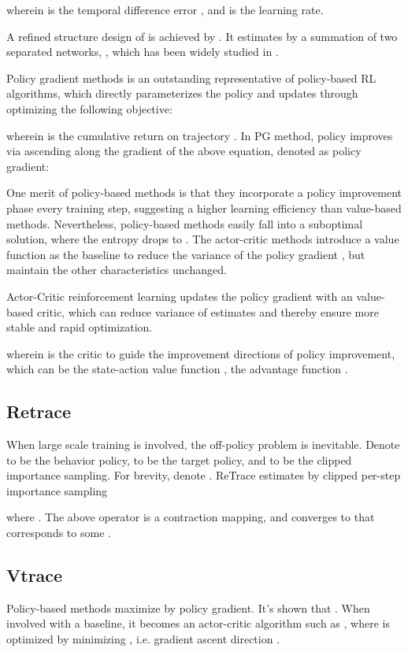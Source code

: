 \documentclass[nohyperref]{article}
\theoremstyle{plain}
\begin{document}
wherein  is the temporal difference error \citep{TDerror}, and  is the learning rate.

A refined structure design of  is achieved by \citep{dueling_q}. It estimates  by a summation of two separated networks, , which has been widely studied in \citep{dueling_q,casa_bridge}.


Policy gradient \citep[PG]{williams1992simple} methods is an outstanding representative of policy-based RL algorithms, which directly parameterizes the policy and  updates through optimizing the following objective: 

wherein  is the cumulative return on trajectory . In PG method, policy improves via ascending  along the gradient of the above equation, denoted as policy gradient:


One merit of policy-based methods is that they incorporate a policy improvement phase every training step, suggesting a higher learning efficiency than value-based methods.
Nevertheless, policy-based methods easily fall into a suboptimal solution, where the entropy drops to  \citep{sac}.
The actor-critic methods introduce a value function as the baseline to reduce the variance of the policy gradient \citep{a3c}, but maintain the other characteristics unchanged.

Actor-Critic \citep[AC]{sutton} reinforcement learning updates the policy gradient with an value-based critic, which can reduce variance of estimates and thereby ensure  more stable and rapid optimization.

wherein  is the critic to guide the improvement directions of policy improvement, which can be the state-action value function , the advantage function .

\subsection{Retrace}

When large scale training is involved, the off-policy problem is inevitable.
Denote  to be the behavior policy,  to be the target policy, and  to be the clipped importance sampling. 
For brevity, denote . 
ReTrace \citep{retrace} estimates  by clipped per-step importance sampling

where . 
The above operator is a contraction mapping, 
and  converges to  that corresponds to some .


\subsection{Vtrace}
Policy-based methods maximize  by policy gradient. 
It's shown \citep{sutton} that . 
When involved with a baseline, it becomes an actor-critic algorithm such as , where  is optimized by minimizing , i.e. gradient ascent direction .
\end{document}
